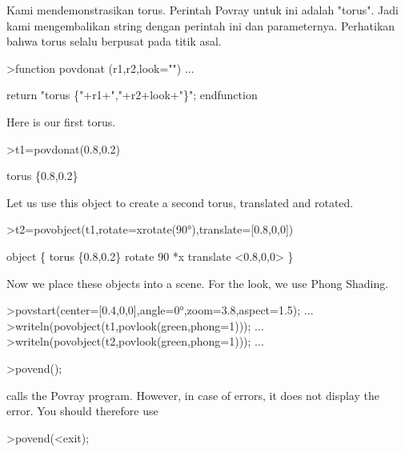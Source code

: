 \documentclass[a4paper,10pt]{article}
\begin{document}
\begin{eulernotebook}
\begin{eulercomment}
Kami mendemonstrasikan torus. Perintah Povray untuk ini adalah
"torus". Jadi kami mengembalikan string dengan perintah ini dan
parameternya. Perhatikan bahwa torus selalu berpusat pada titik asal.
\end{eulercomment}
\begin{eulerprompt}
>function povdonat (r1,r2,look="") ...
\end{eulerprompt}
\begin{eulerudf}
    return "torus \{"+r1+","+r2+look+"\}";
  endfunction
\end{eulerudf}
\begin{eulercomment}
Here is our first torus.
\end{eulercomment}
\begin{eulerprompt}
>t1=povdonat(0.8,0.2)
\end{eulerprompt}
\begin{euleroutput}
  torus \{0.8,0.2\}
\end{euleroutput}
\begin{eulercomment}
Let us use this object to create a second torus, translated and
rotated.
\end{eulercomment}
\begin{eulerprompt}
>t2=povobject(t1,rotate=xrotate(90°),translate=[0.8,0,0])
\end{eulerprompt}
\begin{euleroutput}
  object \{ torus \{0.8,0.2\}
   rotate 90 *x 
   translate <0.8,0,0>
   \}
\end{euleroutput}
\begin{eulercomment}
Now we place these objects into a scene. For the look, we use Phong
Shading.
\end{eulercomment}
\begin{eulerprompt}
>povstart(center=[0.4,0,0],angle=0°,zoom=3.8,aspect=1.5); ...
>writeln(povobject(t1,povlook(green,phong=1))); ...
>writeln(povobject(t2,povlook(green,phong=1))); ...
\end{eulerprompt}
\begin{eulerttcomment}
 >povend();
\end{eulerttcomment}
\begin{eulercomment}
calls the Povray program. However, in case of errors, it does not
display the error. You should therefore use

\end{eulercomment}
\begin{eulerttcomment}
 >povend(<exit);
\end{eulerttcomment}
\begin{eulercomment}


\end{eulercomment}
\end{eulernotebook}
\end{document}
